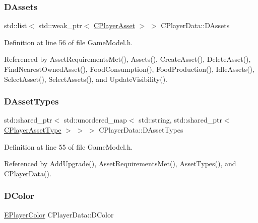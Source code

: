 \hypertarget{classCPlayerData_a1d7dd355facf52db6242e3554373906c}{}\label{classCPlayerData_a1d7dd355facf52db6242e3554373906c} 
\subsubsection{\texorpdfstring{D\+Assets}{DAssets}}
{\footnotesize\ttfamily std\+::list$<$ std\+::weak\+\_\+ptr$<$ \hyperlink{classCPlayerAsset}{C\+Player\+Asset} $>$ $>$ C\+Player\+Data\+::\+D\+Assets\hspace{0.3cm}{\ttfamily [protected]}}



Definition at line 56 of file Game\+Model.\+h.



Referenced by Asset\+Requirements\+Met(), Assets(), Create\+Asset(), Delete\+Asset(), Find\+Nearest\+Owned\+Asset(), Food\+Consumption(), Food\+Production(), Idle\+Assets(), Select\+Asset(), Select\+Assets(), and Update\+Visibility().

\hypertarget{classCPlayerData_ad922f283c60b1c885dac955815ae2b05}{}\label{classCPlayerData_ad922f283c60b1c885dac955815ae2b05} 
\subsubsection{\texorpdfstring{D\+Asset\+Types}{DAssetTypes}}
{\footnotesize\ttfamily std\+::shared\+\_\+ptr$<$ std\+::unordered\+\_\+map$<$ std\+::string, std\+::shared\+\_\+ptr$<$ \hyperlink{classCPlayerAssetType}{C\+Player\+Asset\+Type} $>$ $>$ $>$ C\+Player\+Data\+::\+D\+Asset\+Types\hspace{0.3cm}{\ttfamily [protected]}}



Definition at line 55 of file Game\+Model.\+h.



Referenced by Add\+Upgrade(), Asset\+Requirements\+Met(), Asset\+Types(), and C\+Player\+Data().

\hypertarget{classCPlayerData_a65d69aaa09c8fc0f7ddfa5e858313085}{}\label{classCPlayerData_a65d69aaa09c8fc0f7ddfa5e858313085} 
\subsubsection{\texorpdfstring{D\+Color}{DColor}}
{\footnotesize\ttfamily \hyperlink{GameDataTypes_8h_aafb0ca75933357ff28a6d7efbdd7602f}{E\+Player\+Color} C\+Player\+Data\+::\+D\+Color\hspace{0.3cm}{\ttfamily [protected]}}



